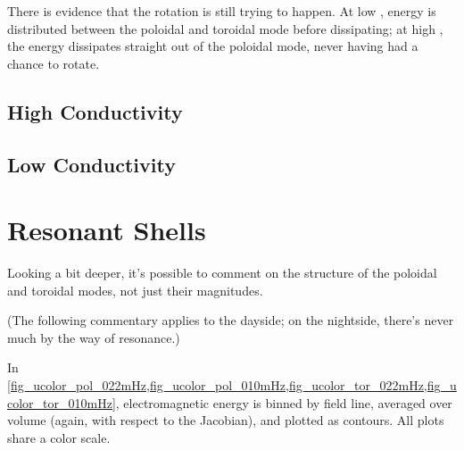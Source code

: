 There is evidence that the rotation is still trying to happen. At low \azm, energy is distributed between the poloidal and toroidal mode before dissipating; at high \azm, the energy dissipates straight out of the poloidal mode, never having had a chance to rotate. 

\subsection{High Conductivity}



\subsection{Low Conductivity}



\section{Resonant Shells}
  \label{sec_shells}

Looking a bit deeper, it's possible to comment on the structure of the poloidal and toroidal modes, not just their magnitudes. 

(The following commentary applies to the dayside; on the nightside, there's never much by the way of resonance.)

In \cref{fig_ucolor_pol_022mHz,fig_ucolor_pol_010mHz,fig_ucolor_tor_022mHz,fig_ucolor_tor_010mHz}, electromagnetic energy is binned by field line, averaged over volume (again, with respect to the Jacobian), and plotted as contours. All plots share a color scale. 

